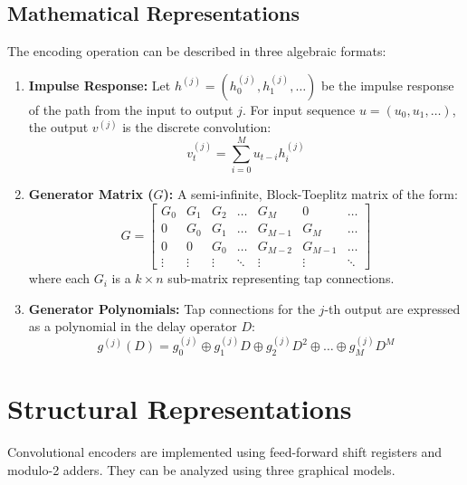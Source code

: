 \documentclass[12pt,a4paper]{article}
\begin{document}
\subsection{Mathematical Representations}
The encoding operation can be described in three algebraic formats:
\begin{tcolorbox}[defbox, title={\textbf{Mathematical Formulations of Convolutional Coding}}]
\begin{enumerate}[leftmargin=*, itemsep=3pt, topsep=0pt]
  \item \textbf{Impulse Response:} Let $h^{(j)} = (h^{(j)}_0, h^{(j)}_1, \dots)$ be the impulse response of the path from the input to output $j$. For input sequence $u = (u_0, u_1, \dots)$, the output $v^{(j)}$ is the discrete convolution:
    \[ v^{(j)}_t = \sum_{i=0}^M u_{t-i} h^{(j)}_i \]
  \item \textbf{Generator Matrix (\texorpdfstring{$G$}{G}):} A semi-infinite, Block-Toeplitz matrix of the form:
    \[ G = \begin{bmatrix} 
      G_0 & G_1 & G_2 & \dots & G_M & 0 & \dots \\
      0   & G_0 & G_1 & \dots & G_{M-1} & G_M & \dots \\
      0   & 0   & G_0 & \dots & G_{M-2} & G_{M-1} & \dots \\
      \vdots & \vdots & \vdots & \ddots & \vdots & \vdots & \ddots
    \end{bmatrix} \]
    where each $G_i$ is a $k \times n$ sub-matrix representing tap connections.
  \item \textbf{Generator Polynomials:} Tap connections for the $j$-th output are expressed as a polynomial in the delay operator $D$:
    \[ g^{(j)}(D) = g^{(j)}_0 \oplus g^{(j)}_1 D \oplus g^{(j)}_2 D^2 \oplus \dots \oplus g^{(j)}_M D^M \]
\end{enumerate}
\end{tcolorbox}

\section{Structural Representations}

Convolutional encoders are implemented using feed-forward shift registers and modulo-2 adders. They can be analyzed using three graphical models.
\end{document}
